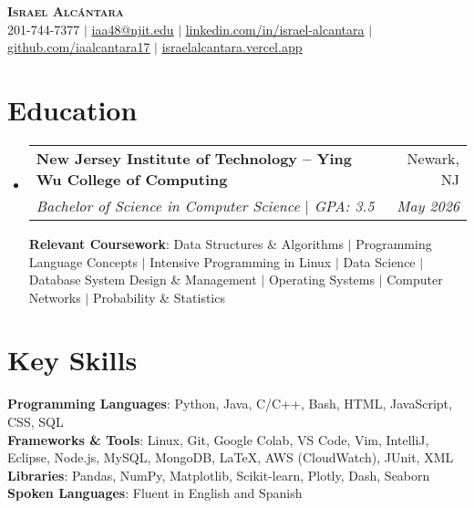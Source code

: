 \documentclass[letterpaper,11pt]{article}
\makeatletter
\newcommand{\resumeSubheading}[4]{
  \vspace{-2pt}\item
    \begin{tabular*}{0.97\textwidth}[t]{l@{\extracolsep{\fill}}r}
      \textbf{#1} & #2 \\
      \textit{\small#3} & \textit{\small #4} \\
    \end{tabular*}\vspace{-7pt}
}
\newcommand{\resumeSubHeadingListStart}{\begin{itemize}[leftmargin=0.15in, label={}]}
\newcommand{\resumeSubHeadingListEnd}{\end{itemize}}
\makeatother
\begin{document}
\begin{center}
    \textbf{\Huge \scshape Israel Alcántara} \\ \vspace{1pt}
    \small 201-744-7377 $|$ 
    \href{mailto:iaa48@njit.edu}{\underline{iaa48@njit.edu}} $|$ 
    \href{https://linkedin.com/in/israel-alcantara}{\underline{linkedin.com/in/israel-alcantara}} $|$
    \href{https://github.com/iaalcantara17}{\underline{github.com/iaalcantara17}} $|$
    \href{https://israelalcantara.vercel.app/}{\underline{israelalcantara.vercel.app}}
\end{center}

\section{Education}
  \resumeSubHeadingListStart
    \resumeSubheading
      {New Jersey Institute of Technology – Ying Wu College of Computing}{Newark, NJ}
      {Bachelor of Science in Computer Science $|$ GPA: 3.5}{May 2026}
      \begin{flushleft}
        \small \textbf{Relevant Coursework}: Data Structures \& Algorithms $|$ Programming Language Concepts $|$ Intensive Programming in Linux $|$ Data Science $|$ Database System Design \& Management $|$ Operating Systems $|$ Computer Networks $|$ Probability \& Statistics
      \end{flushleft}
  \resumeSubHeadingListEnd

\section{Key Skills}
\begin{itemize}[leftmargin=0.15in, label={}]
    \small{\item{
      \textbf{Programming Languages}{: Python, Java, C/C++, Bash, HTML, JavaScript, CSS, SQL} \\
      \textbf{Frameworks \& Tools}{: Linux, Git, Google Colab, VS Code, Vim, IntelliJ, Eclipse, Node.js, MySQL, MongoDB, LaTeX, AWS (CloudWatch), JUnit, XML} \\
      \textbf{Libraries}{: Pandas, NumPy, Matplotlib, Scikit-learn, Plotly, Dash, Seaborn} \\
      \textbf{Spoken Languages}{: Fluent in English and Spanish} \\
    }}
\end{itemize}
\end{document}
